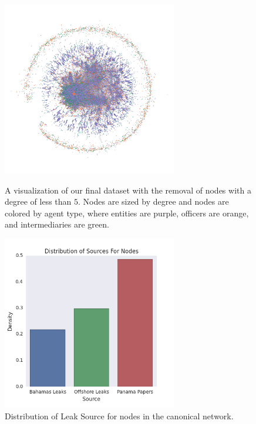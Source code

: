 \documentclass[11pt]{article}
\begin{document}
\begin{figure}[H]
\centering
\begin{minipage}{.5\textwidth}
  \centering
  \includegraphics[width=3in]{figures/figure1.png}
  \caption{A visualization of our final dataset with the removal of
            nodes with a degree of less than $5.$ Nodes are sized by
            degree and nodes are colored by agent type, where entities are
            purple, officers are orange, and intermediaries are green.}
  \label{fig1}
\end{minipage}%
\begin{minipage}{.5\textwidth}
  \centering
  \includegraphics[width=3in]{figures/figure2.png}
  \caption{Distribution of Leak Source for nodes in the canonical
                    network.}
  \label{fig2}
\end{minipage}
\end{figure}
\end{document}
